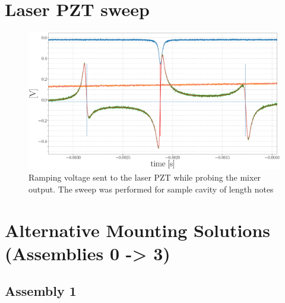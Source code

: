 \section{Laser PZT sweep}

\begin{figure}[H]
	\includegraphics[width=.95\textwidth]{figs/ALGAAS/pdh_measured.pdf}
	\caption{Ramping voltage sent to the laser PZT while probing the mixer output. The sweep was performed for sample cavity of length notes}
\label{fig:pdhmeasured}
\end{figure}

\newpage

\section{Alternative Mounting Solutions (Assemblies 0 -> 3)}
\subsection{Assembly 1}


